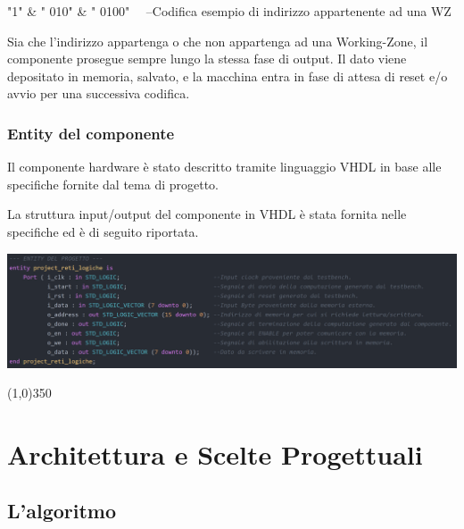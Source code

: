 \documentclass{article}
\newenvironment{gitFont}{\fontfamily{zi4}\selectfont}{\par}
\begin{document}
\begin{flushleft}
\bigskip


\begin{gitFont}

"1" \& " 010" \& " 0100"  \ \ --Codifica esempio di indirizzo appartenente ad una WZ

\end{gitFont}


\bigskip

Sia che l'indirizzo appartenga o che non appartenga ad una Working-Zone, il componente prosegue sempre lungo la stessa fase di output. Il dato viene depositato in memoria, salvato, e la macchina entra in fase di attesa di reset e/o avvio per una successiva codifica.
\end{flushleft}
\subsubsection{Entity del componente}

Il componente hardware è stato descritto tramite linguaggio VHDL in base alle specifiche fornite dal tema di progetto.

La struttura input/output del componente in VHDL è stata fornita nelle specifiche ed è di seguito riportata.


\begin{center}
\includegraphics[scale=0.27]{Entity}
\end{center}

\bigskip
\bigskip

\begin{center}
\line(1,0){350}
\end{center}

\newpage

\section{Architettura e Scelte Progettuali}

\bigskip

\subsection{L'algoritmo}
\end{document}
